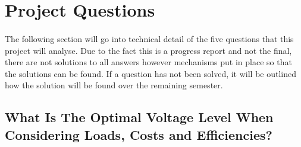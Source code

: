\section{Project Questions}

\paragraph{}
The following section will go into technical detail of the five questions that this project will analyse. Due to the fact this is a progress report and not the final, there are not solutions to all answers however mechanisms put in place so that the solutions can be found. If a question has not been solved, it will be outlined how the solution will be found over the remaining semester. 

\subsection{What Is The Optimal Voltage Level When Considering Loads, Costs and Efficiencies?}

